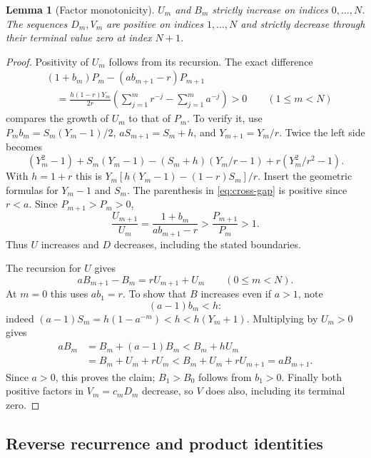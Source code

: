 \documentclass[11pt]{article}
\numberwithin{equation}{section}
\newtheorem{lemma}[theorem]{Lemma}
\theoremstyle{remark}
\begin{document}
\begin{lemma}[Factor monotonicity]
\label{lem:factor-signs}
$U_m$ and $B_m$ strictly increase on indices $0,\ldots,N$.
The sequences $D_m,V_m$ are positive on indices $1,\ldots,N$ and
strictly decrease through their terminal value zero at index $N+1$.
\end{lemma}
\begin{proof}
Positivity of $U_m$ follows from its recursion. The exact difference
\begin{equation}
\begin{split}
&(1+b_m)P_m-(ab_{m+1}-r)P_{m+1}\\
&\quad=\frac{h(1-r)Y_m}{2r}
\left(\sum_{j=1}^{m}r^{-j}-\sum_{j=1}^{m}a^{-j}\right)>0
\qquad(1\leq m<N)
\end{split}
\label{eq:cross-gap}
\end{equation}
compares the growth of $U_m$ to that of $P_m$.
To verify it, use $P_mb_m=S_m(Y_m-1)/2$,
$aS_{m+1}=S_m+h$, and $Y_{m+1}=Y_m/r$.
Twice the left side becomes
\[
(Y_m^2-1)+S_m(Y_m-1)
 -(S_m+h)(Y_m/r-1)+r(Y_m^2/r^2-1).
\]
With $h=1+r$ this is $Y_m[h(Y_m-1)-(1-r)S_m]/r$.
Insert the geometric formulas for $Y_m-1$ and $S_m$.
The parenthesis in \eqref{eq:cross-gap} is positive since $r<a$.
Since $P_{m+1}>P_m>0$,
\[
\frac{U_{m+1}}{U_m}
=\frac{1+b_m}{ab_{m+1}-r}
>\frac{P_{m+1}}{P_m}>1.
\]
Thus $U$ increases and $D$ decreases, including the stated boundaries.

The recursion for $U$ gives
\begin{equation}
aB_{m+1}-B_m=rU_{m+1}+U_m\qquad(0\leq m<N).
\label{eq:forward-recurrence}
\end{equation}
At $m=0$ this uses $ab_1=r$. To show that $B$ increases even if
$a>1$, note
\begin{equation}
(a-1)b_m<h:
\label{eq:b-bound}
\end{equation}
indeed $(a-1)S_m=h(1-a^{-m})<h<h(Y_m+1)$.
Multiplying by $U_m>0$ gives
\begin{align*}
aB_m&=B_m+(a-1)B_m<B_m+hU_m\\
&=B_m+U_m+rU_m
 <B_m+U_m+rU_{m+1}=aB_{m+1}.
\end{align*}
Since $a>0$, this proves the claim; $B_1>B_0$ follows from $b_1>0$.
Finally both positive factors in $V_m=c_mD_m$ decrease, so $V$ does
also, including its terminal zero.
\end{proof}

\subsection{Reverse recurrence and product identities}
\end{document}
